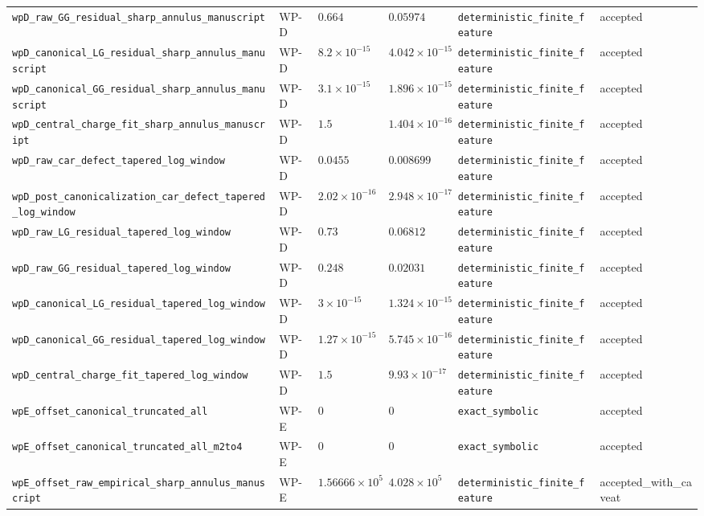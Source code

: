 \begin{table}[t]
\begin{tabular}{@{}llllll@{}}
\texttt{wpD\_raw\_GG\_residual\_sharp\_annulus\_manuscript} & WP-D & $0.664$ & $0.05974$ & \texttt{deterministic\_finite\_feature} & accepted \\
\texttt{wpD\_canonical\_LG\_residual\_sharp\_annulus\_manuscript} & WP-D & $8.2\times10^{-15}$ & $4.042\times10^{-15}$ & \texttt{deterministic\_finite\_feature} & accepted \\
\texttt{wpD\_canonical\_GG\_residual\_sharp\_annulus\_manuscript} & WP-D & $3.1\times10^{-15}$ & $1.896\times10^{-15}$ & \texttt{deterministic\_finite\_feature} & accepted \\
\texttt{wpD\_central\_charge\_fit\_sharp\_annulus\_manuscript} & WP-D & $1.5$ & $1.404\times10^{-16}$ & \texttt{deterministic\_finite\_feature} & accepted \\
\texttt{wpD\_raw\_car\_defect\_tapered\_log\_window} & WP-D & $0.0455$ & $0.008699$ & \texttt{deterministic\_finite\_feature} & accepted \\
\texttt{wpD\_post\_canonicalization\_car\_defect\_tapered\_log\_window} & WP-D & $2.02\times10^{-16}$ & $2.948\times10^{-17}$ & \texttt{deterministic\_finite\_feature} & accepted \\
\texttt{wpD\_raw\_LG\_residual\_tapered\_log\_window} & WP-D & $0.73$ & $0.06812$ & \texttt{deterministic\_finite\_feature} & accepted \\
\texttt{wpD\_raw\_GG\_residual\_tapered\_log\_window} & WP-D & $0.248$ & $0.02031$ & \texttt{deterministic\_finite\_feature} & accepted \\
\texttt{wpD\_canonical\_LG\_residual\_tapered\_log\_window} & WP-D & $3\times10^{-15}$ & $1.324\times10^{-15}$ & \texttt{deterministic\_finite\_feature} & accepted \\
\texttt{wpD\_canonical\_GG\_residual\_tapered\_log\_window} & WP-D & $1.27\times10^{-15}$ & $5.745\times10^{-16}$ & \texttt{deterministic\_finite\_feature} & accepted \\
\texttt{wpD\_central\_charge\_fit\_tapered\_log\_window} & WP-D & $1.5$ & $9.93\times10^{-17}$ & \texttt{deterministic\_finite\_feature} & accepted \\
\texttt{wpE\_offset\_canonical\_truncated\_all} & WP-E & $0$ & $0$ & \texttt{exact\_symbolic} & accepted \\
\texttt{wpE\_offset\_canonical\_truncated\_all\_m2to4} & WP-E & $0$ & $0$ & \texttt{exact\_symbolic} & accepted \\
\texttt{wpE\_offset\_raw\_empirical\_sharp\_annulus\_manuscript} & WP-E & $1.56666\times10^{5}$ & $4.028\times10^{5}$ & \texttt{deterministic\_finite\_feature} & accepted\_with\_caveat \\

\end{tabular}
\end{table}
